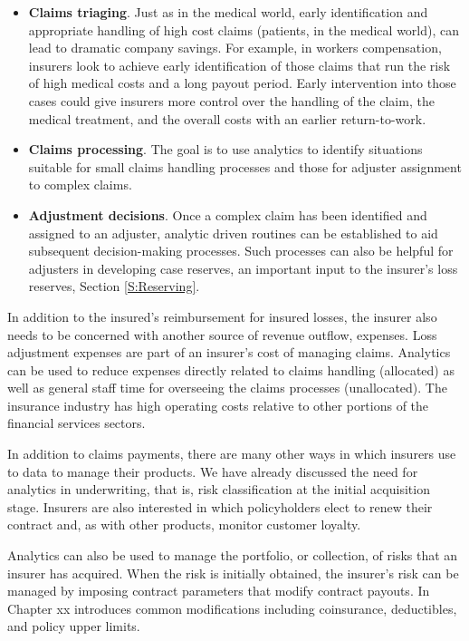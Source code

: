 \documentclass[]{book}
\theoremstyle{definition}
\theoremstyle{definition}
\theoremstyle{definition}
\theoremstyle{remark}
\begin{document}
\begin{itemize}
\item
  \textbf{Claims triaging}. Just as in the medical world, early
  identification and appropriate handling of high cost claims (patients,
  in the medical world), can lead to dramatic company savings. For
  example, in workers compensation, insurers look to achieve early
  identification of those claims that run the risk of high medical costs
  and a long payout period. Early intervention into those cases could
  give insurers more control over the handling of the claim, the medical
  treatment, and the overall costs with an earlier return-to-work.
\item
  \textbf{Claims processing}. The goal is to use analytics to identify
  situations suitable for small claims handling processes and those for
  adjuster assignment to complex claims.
\item
  \textbf{Adjustment decisions}. Once a complex claim has been
  identified and assigned to an adjuster, analytic driven routines can
  be established to aid subsequent decision-making processes. Such
  processes can also be helpful for adjusters in developing case
  reserves, an important input to the insurer's loss reserves, Section
  \ref{S:Reserving}.
\end{itemize}

In addition to the insured's reimbursement for insured losses, the
insurer also needs to be concerned with another source of revenue
outflow, expenses. Loss adjustment expenses are part of an insurer's
cost of managing claims. Analytics can be used to reduce expenses
directly related to claims handling (allocated) as well as general staff
time for overseeing the claims processes (unallocated). The insurance
industry has high operating costs relative to other portions of the
financial services sectors.

In addition to claims payments, there are many other ways in which
insurers use to data to manage their products. We have already discussed
the need for analytics in underwriting, that is, risk classification at
the initial acquisition stage. Insurers are also interested in which
policyholders elect to renew their contract and, as with other products,
monitor customer loyalty.

Analytics can also be used to manage the portfolio, or collection, of
risks that an insurer has acquired. When the risk is initially obtained,
the insurer's risk can be managed by imposing contract parameters that
modify contract payouts. In Chapter xx introduces common modifications
including coinsurance, deductibles, and policy upper limits.
\end{document}
